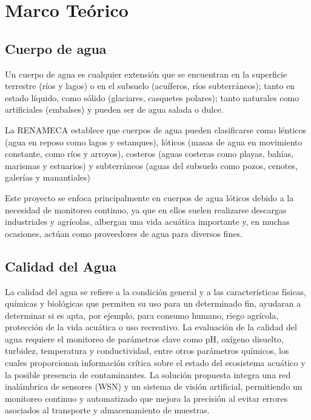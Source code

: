 \chapter{Marco Teórico}

\section{Cuerpo de agua}
Un cuerpo de agua es cualquier extensión que se encuentran en la superficie terrestre (ríos y lagos) o en el subsuelo (acuíferos, ríos subterráneos); tanto en estado líquido, como sólido (glaciares, casquetes polares); tanto naturales como artificiales (embalses) y pueden ser de agua salada o dulce\cite{agua2024}.

La RENAMECA establece que cuerpos de agua pueden clasificarse como lénticos (agua en reposo como lagos y estanques), lóticos (masas de agua en movimiento constante, como ríos y arroyos), costeros (aguas costeras como playas, bahías, marismas y estuarios) y subterráneos (aguas del subsuelo como pozos, cenotes, galerías y manantiales)

Este proyecto se enfoca principalmente en cuerpos de agua lóticos debido a la necesidad de monitoreo continuo, ya que en ellos suelen realizarse descargas industriales y agrícolas, albergan una vida acuática importante y, en muchas ocasiones, actúan como proveedores de agua para diversos fines. 

\section{Calidad del Agua}
La calidad del agua se refiere a la condición general y a las características físicas, químicas y biológicas que permiten su uso para un determinado fin, ayudaran a determinar si es apta, por ejemplo, para consumo humano, riego agrícola, protección de la vida acuática o uso recreativo. 
La evaluación de la calidad del agua requiere el monitoreo de parámetros clave como pH, oxígeno disuelto, turbidez, temperatura y conductividad, entre otros parámetros químicos, los cuales proporcionan información crítica sobre el estado del ecosistema acuático y la posible presencia de contaminantes.
La solución propuesta integra una red inalámbrica de sensores (WSN) y un sistema de visión artificial, permitiendo un monitoreo continuo y automatizado que mejora la precisión al evitar errores asociados al transporte y almacenamiento de muestras.

